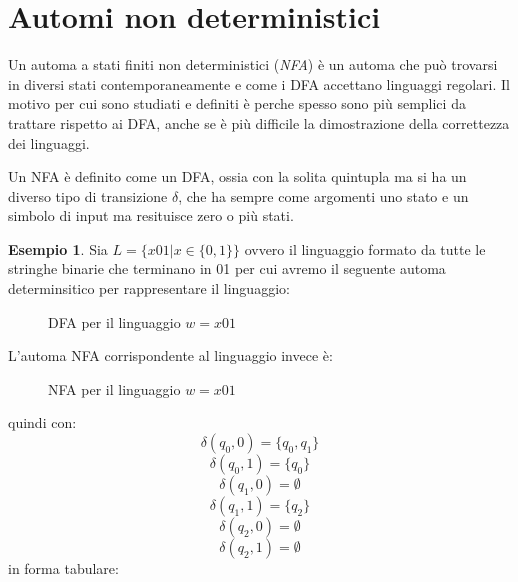 \documentclass[a4paper]{book}
\theoremstyle{definition}%
\newtheorem*{esempio}{Esempio}
\begin{document}
\section{Automi non deterministici}
Un automa a stati finiti non deterministici (\emph{NFA}) è un automa che può trovarsi in diversi stati contemporaneamente e come i DFA accettano linguaggi regolari.\newline
Il motivo per cui sono studiati e definiti è perche spesso sono più semplici da trattare rispetto ai DFA,
anche se è più difficile la dimostrazione della correttezza dei linguaggi.

Un NFA è definito come un DFA, ossia con la solita quintupla ma si ha un diverso tipo di transizione $\delta$,
che ha sempre come argomenti uno stato e un simbolo di input ma resituisce zero o più stati.
\begin{esempio}
Sia $L = \{x01| x\in\{0,1\}\}$ ovvero il linguaggio formato da tutte le stringhe binarie che terminano in 01
per cui avremo il seguente automa determinsitico per rappresentare il linguaggio:
\begin{figure}
\centering
\caption{DFA per il linguaggio $w = x01$}
\end{figure}
L'automa NFA corrispondente al linguaggio invece è:
\begin{figure}
\centering
\caption{NFA per il linguaggio $w = x01$}
\end{figure}
quindi con:
\[ \delta(q_0,0)=\{q_0,q_1\} \]
\[ \delta(q_0,1)=\{q_0\} \]
\[ \delta(q_1,0)=\emptyset \]
\[ \delta(q_1,1)=\{q_2\} \]
\[ \delta(q_2,0)=\emptyset \]
\[ \delta(q_2,1)=\emptyset \]
in forma tabulare:

\end{esempio}
\end{document}

